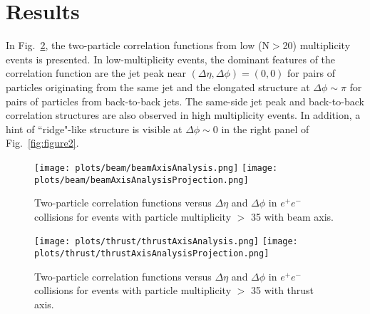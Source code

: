 \documentclass[aps,prl,twocolumn,showpacs,superscriptaddress,groupedaddress]{revtex4}  %
\begin{document}
\section{\label{sec:results}Results}
In Fig.~\ref{fig:figure1}, the two-particle correlation functions from low (N$>$20) multiplicity events is presented. In low-multiplicity events, the dominant features of the correlation function are the jet peak near $(\Delta\eta,\Delta\phi)=(0,0)$ for pairs of particles originating from the same jet and the elongated structure at $\Delta\phi\sim\pi$ for pairs of particles from back-to-back jets. %
The same-side jet peak and back-to-back correlation structures are also observed in high multiplicity events. 
In addition, a hint of ``ridge"-like structure is visible at $\Delta\phi \sim$0 in the right panel of Fig.~\ref{fig:figure2}. 

\begin{figure}[!htb]
\begin{center}
\texttt{[image: plots/beam/beamAxisAnalysis.png]}
\texttt{[image: plots/beam/beamAxisAnalysisProjection.png]}
\caption{Two-particle correlation functions versus $\Delta\eta$ and $\Delta\phi$ in $e^{+}e^{-}$ collisions for events with particle multiplicity $>$ 35 with beam axis.}
\label{fig:figure1} 
\end{center}
\end{figure}

\begin{figure}[!htb]
\begin{center}
\texttt{[image: plots/thrust/thrustAxisAnalysis.png]}
\texttt{[image: plots/thrust/thrustAxisAnalysisProjection.png]}
\caption{Two-particle correlation functions versus $\Delta\eta$ and $\Delta\phi$ in $e^{+}e^{-}$ collisions for events with particle multiplicity $>$ 35 with thrust axis.}
\label{fig:figure1} 
\end{center}
\end{figure}
\end{document}
